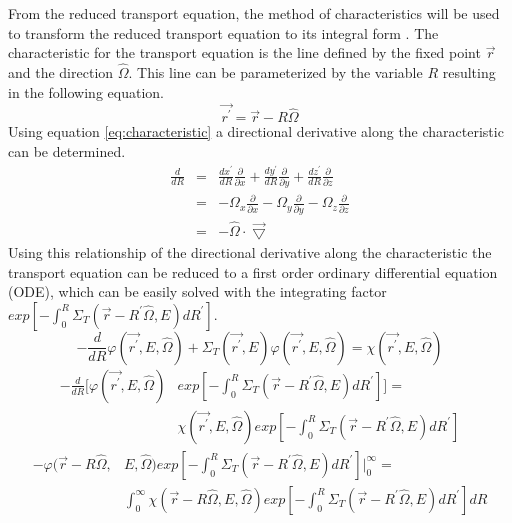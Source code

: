 From the reduced transport equation, the method of characteristics will be 
used to transform the reduced transport equation to its integral form
\citep{lewis+miller}. The characteristic for the transport equation is the line
defined by the fixed point $\vec{r}$ and the direction $\hat{\Omega}$. This 
line can be parameterized by the variable $R$ resulting in the following 
equation. 
\begin{equation}
  \vec{r^{'}} = \vec{r} - R\hat{\Omega}
  \label{eq:characteristic}
\end{equation}
Using equation \ref{eq:characteristic} a directional derivative along the
characteristic can be determined.
\begin{eqnarray}
  \frac{d}{dR} & = & \frac{dx^{'}}{dR}\frac{\partial}{\partial x} +
  \frac{dy^{'}}{dR}\frac{\partial}{\partial y} +
  \frac{dz^{'}}{dR}\frac{\partial}{\partial z} \nonumber \\
  & = & -\Omega_x \frac{\partial}{\partial x} -
  \Omega_y \frac{\partial}{\partial y} -
  \Omega_z \frac{\partial}{\partial z} \nonumber \\
  & = & -\hat{\Omega} \cdot \vec{\bigtriangledown}
\end{eqnarray}
Using this relationship of the directional derivative along the characteristic
the transport equation can be reduced to a first order ordinary differential 
equation (ODE), which can be easily solved with the integrating factor
$exp\left[-\int_0^R \Sigma_T(\vec{r}-R^{'}\hat{\Omega},E)dR^{'} \right]$.
\begin{equation*}
  -\frac{d}{dR}\varphi(\vec{r^{'}},E,\hat{\Omega}) + \Sigma_T(\vec{r^{'}},E)
  \varphi(\vec{r^{'}},E,\hat{\Omega}) = 
  \chi(\vec{r^{'}},E,\hat{\Omega})
\end{equation*}
\begin{equation*}
  \begin{split}
    -\frac{d}{dR}\bigg[\varphi(\vec{r^{'}},E,\hat{\Omega})
      &exp\left[-\int_0^R \Sigma_T(\vec{r}-R^{'}\hat{\Omega},E)dR^{'}\right]
      \bigg] = \\
    & \chi(\vec{r^{'}},E,\hat{\Omega})
    exp\left[-\int_0^R \Sigma_T(\vec{r}-R^{'}\hat{\Omega},E)dR^{'} \right]
  \end{split}
\end{equation*}
\begin{equation*}
  \begin{split}
    -\varphi(\vec{r} - R\hat{\Omega},&E,\hat{\Omega})
    exp\left[-\int_0^R \Sigma_T(\vec{r}-R^{'}\hat{\Omega},E)dR^{'}\right] 
    \bigg|_0^{\infty} = \\
    & \int_0^{\infty} 
    \chi(\vec{r} - R\hat{\Omega},E,\hat{\Omega})
    exp\left[-\int_0^R \Sigma_T(\vec{r}-R^{'}\hat{\Omega},E)dR^{'} \right] dR
  \end{split}
\end{equation*}

